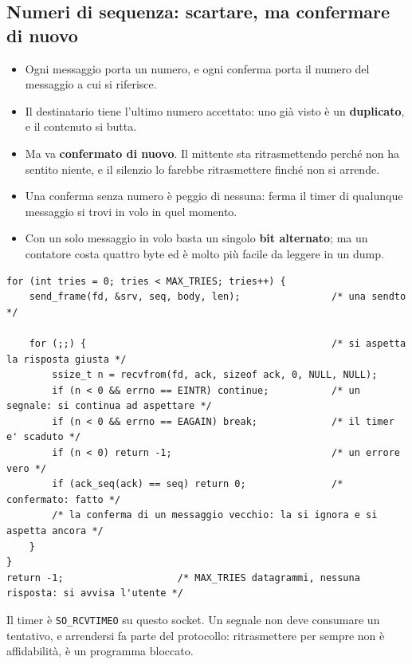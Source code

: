 \subsection{Numeri di sequenza: scartare, ma confermare di nuovo}

\begin{itemize}
    \item Ogni messaggio porta un numero, e ogni conferma porta il numero del messaggio a cui si riferisce.
    \item Il destinatario tiene l'ultimo numero accettato: uno già visto è un \textbf{duplicato}, e il contenuto si butta.
    \item Ma va \textbf{confermato di nuovo}. Il mittente sta ritrasmettendo perché non ha sentito niente, e il silenzio lo
          farebbe ritrasmettere finché non si arrende.
    \item Una conferma senza numero è peggio di nessuna: ferma il timer di qualunque messaggio si trovi in volo in quel
          momento.
    \item Con un solo messaggio in volo basta un singolo \textbf{bit alternato}; ma un contatore costa quattro byte ed è molto
          più facile da leggere in un dump.
\end{itemize}

\begin{lstlisting}[language={[POSIX]C}, style=wnumbers, title={Il ciclo di ritrasmissione}]
for (int tries = 0; tries < MAX_TRIES; tries++) {
    send_frame(fd, &srv, seq, body, len);                /* una sendto */

    for (;;) {                                           /* si aspetta la risposta giusta */
        ssize_t n = recvfrom(fd, ack, sizeof ack, 0, NULL, NULL);
        if (n < 0 && errno == EINTR) continue;           /* un segnale: si continua ad aspettare */
        if (n < 0 && errno == EAGAIN) break;             /* il timer e' scaduto */
        if (n < 0) return -1;                            /* un errore vero */
        if (ack_seq(ack) == seq) return 0;               /* confermato: fatto */
        /* la conferma di un messaggio vecchio: la si ignora e si aspetta ancora */
    }
}
return -1;                    /* MAX_TRIES datagrammi, nessuna risposta: si avvisa l'utente */
\end{lstlisting}

Il timer è \texttt{SO\_RCVTIMEO} su questo socket. Un segnale non deve consumare un tentativo, e arrendersi fa parte del
protocollo: ritrasmettere per sempre non è affidabilità, è un programma bloccato.


